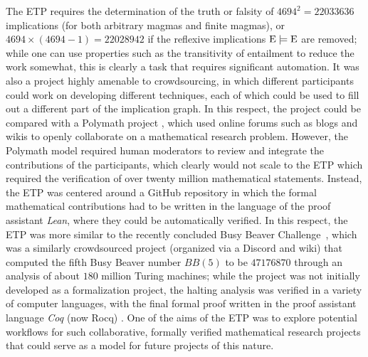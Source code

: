 The ETP requires the determination of the truth or falsity of $\num{4694}^2 = \num{22033636}$ implications (for both arbitrary magmas and finite magmas), or $\num{4694} \times (\num{4694}-1) = \num{22028942}$ if the reflexive implications ${\mathrm{E}} \models \mathrm{E}$ are removed; while one can use properties such as the transitivity of entailment to reduce the work somewhat, this is clearly a task that requires significant automation. It was also a project highly amenable to crowdsourcing, in which different participants could work on developing different techniques, each of which could be used to fill out a different part of the implication graph. In this respect, the project could be compared with a Polymath project \cite{Gowers2009}, which used online forums such as blogs and wikis to openly collaborate on a mathematical research problem. However, the Polymath model required human moderators to review and integrate the contributions of the participants, which clearly would not scale to the ETP which required the verification of over twenty million mathematical statements. Instead, the ETP was centered around a GitHub repository in which the formal mathematical contributions had to be written in the language of the proof assistant \emph{Lean}, where they could be automatically verified. In this respect, the ETP was more similar to the recently concluded Busy Beaver Challenge~\cite{bbchallenge_bb5}, which was a similarly crowdsourced project (organized via a Discord and wiki) that computed the fifth Busy Beaver number $BB(5)$ to be $\num{47176870}$ through an analysis of about $180$ million Turing machines; while the project was not initially developed as a formalization project, the halting analysis was verified in a variety of computer languages, with the final formal proof written in the proof assistant language \emph{Coq} (now Rocq) \cite{the_coq_development_team_2024_14542673, the_rocq_development_team_2026_19256047, bbchallenge_bb5}. One of the aims of the ETP was to explore potential workflows for such collaborative, formally verified mathematical research projects that could serve as a model for future projects of this nature.

